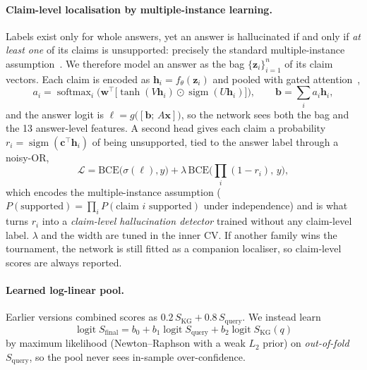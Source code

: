\documentclass[10pt,twocolumn]{article}
\theoremstyle{remark}
\DeclareMathOperator{\logit}{logit}
\newcommand{\SKGq}{S_{\mathrm{KG}}(q)}
\begin{document}
\paragraph{Claim-level localisation by multiple-instance learning.}
Labels exist only for whole answers, yet an answer is hallucinated if and only if \emph{at least one} of its claims is
unsupported: precisely the standard multiple-instance assumption~\cite{dietterich1997mil}. We therefore model an
answer as the bag $\{\bm z_i\}_{i=1}^{n}$ of its claim vectors. Each claim is encoded as $\bm h_i=f_\theta(\bm z_i)$ and
pooled with gated attention~\cite{ilse2018attention},
\begin{equation}
a_i=\operatorname{softmax}_i\!\Big(\bm w^\top\big[\tanh(V\bm h_i)\odot\operatorname{sigm}(U\bm h_i)\big]\Big),\qquad
\bm b=\sum_i a_i\bm h_i,
\end{equation}
and the answer logit is $\ell=g\big([\bm b;\,A\bm x]\big)$, so the network sees both the bag and the 13 answer-level
features. A second head gives each claim a probability $r_i=\operatorname{sigm}(\bm c^\top\bm h_i)$ of being
unsupported, tied to the answer label through a noisy-OR,
\begin{equation}
\mathcal L=\mathrm{BCE}\big(\sigma(\ell),y\big)+\lambda\,\mathrm{BCE}\Big(\textstyle\prod_i(1-r_i),\,y\Big),
\end{equation}
which encodes the multiple-instance assumption ($P(\text{supported})=\prod_i P(\text{claim } i \text{ supported})$ under
independence) and is what turns $r_i$ into a \emph{claim-level hallucination detector} trained without any
claim-level label. $\lambda$ and the width are tuned in the inner CV. If another family wins the tournament, the
network is still fitted as a companion localiser, so claim-level scores are always reported.

\paragraph{Learned log-linear pool.}
Earlier versions combined scores as $0.2\,S_{\mathrm{KG}}+0.8\,S_{\mathrm{query}}$. We instead learn
\begin{equation}
\logit S_{\mathrm{final}}=b_0+b_1\logit S_{\mathrm{query}}+b_2\logit\SKGq
\label{eq:pool}
\end{equation}
by maximum likelihood (Newton--Raphson with a weak $L_2$ prior) on \emph{out-of-fold} $S_{\mathrm{query}}$, so the pool
never sees in-sample over-confidence.
\end{document}
